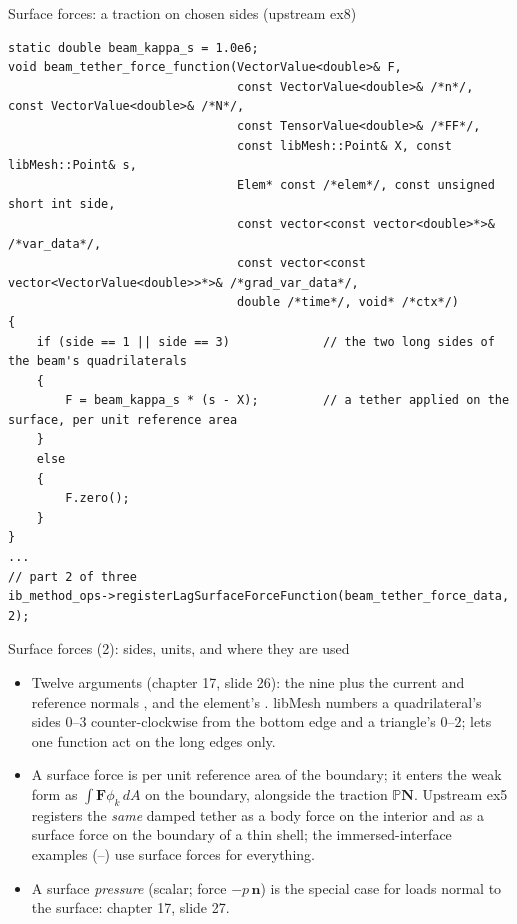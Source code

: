 \documentclass[aspectratio=169,11pt]{beamer}
\begin{document}
\begin{frame}[fragile]{Surface forces: a traction on chosen sides (upstream ex8)}
\label{fr:surface}
\footnotesize
\begin{lstlisting}[style=cpptiny]
static double beam_kappa_s = 1.0e6;
void beam_tether_force_function(VectorValue<double>& F,
                                const VectorValue<double>& /*n*/, const VectorValue<double>& /*N*/,
                                const TensorValue<double>& /*FF*/,
                                const libMesh::Point& X, const libMesh::Point& s,
                                Elem* const /*elem*/, const unsigned short int side,
                                const vector<const vector<double>*>& /*var_data*/,
                                const vector<const vector<VectorValue<double>>*>& /*grad_var_data*/,
                                double /*time*/, void* /*ctx*/)
{
    if (side == 1 || side == 3)             // the two long sides of the beam's quadrilaterals
    {
        F = beam_kappa_s * (s - X);         // a tether applied on the surface, per unit reference area
    }
    else
    {
        F.zero();
    }
}
...
// part 2 of three
ib_method_ops->registerLagSurfaceForceFunction(beam_tether_force_data, 2);
\end{lstlisting}
\end{frame}

\begin{frame}{Surface forces (2): sides, units, and where they are used}
\label{fr:surface2}
\footnotesize
\begin{itemize}
  \item Twelve arguments (chapter 17, slide 26): the nine plus the current and reference normals ,  and the element's . libMesh numbers a quadrilateral's sides $0$--$3$ counter-clockwise from the bottom edge and a triangle's $0$--$2$;  lets one function act on the long edges only.
  \item A surface force is per unit reference area of the boundary; it enters the weak form as $\int \mathbf{F}\phi_k\,dA$ on the boundary, alongside the traction $\mathbb{P}\mathbf{N}$. Upstream ex5 registers the \emph{same} damped tether as a body force on the interior and as a surface force on the boundary of a thin shell; the immersed-interface examples (--) use surface forces for everything.
  \item A surface \emph{pressure} (scalar; force $-p\,\mathbf{n}$) is the special case for loads normal to the surface: chapter 17, slide 27.
\end{itemize}
\end{frame}
\end{document}
